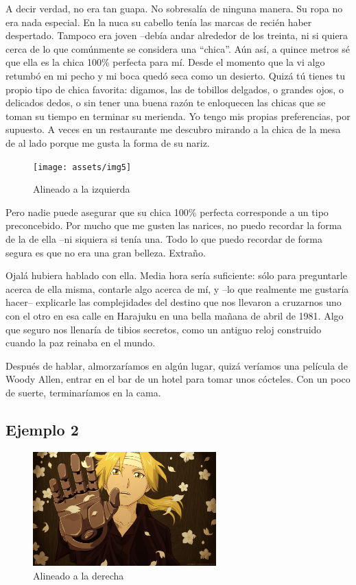 \documentclass[letterpaper]{article}
\begin{document}
  A decir verdad, no era tan guapa. No sobresalía de ninguna manera. Su ropa no
  era nada especial. En la nuca su cabello tenía las marcas de recién haber
  despertado. Tampoco era joven –debía andar alrededor de los treinta, ni si
  quiera cerca de lo que comúnmente se considera una “chica”. Aún así, a quince
  metros sé que ella es la chica 100\% perfecta para mí. Desde el momento que la
  vi algo retumbó en mi pecho y mi boca quedó seca como un desierto. Quizá tú
  tienes tu propio tipo de chica favorita: digamos, las de tobillos delgados, o
  grandes ojos, o delicados dedos, o sin tener una buena razón te enloquecen las
  chicas que se toman su tiempo en terminar su merienda. Yo tengo mis propias
  preferencias, por supuesto. A veces en un restaurante me descubro mirando a la
  chica de la mesa de al lado porque me gusta la forma de su nariz.
	
	\begin{figure}
		\centering
		\texttt{[image: assets/img5]}
		\caption{Alineado a la izquierda}
	\end{figure}

Pero nadie puede asegurar que su chica 100\% perfecta corresponde a un tipo
preconcebido. Por mucho que me gusten las narices, no puedo recordar la forma de
la de ella –ni siquiera si tenía una. Todo lo que puedo recordar de forma segura
es que no era una gran belleza. Extraño.

Ojalá hubiera hablado con ella. Media hora sería suficiente: sólo para
preguntarle acerca de ella misma, contarle algo acerca de mí, y –lo que
realmente me gustaría hacer– explicarle las complejidades del destino que nos
llevaron a cruzarnos uno con el otro en esa calle en Harajuku en una bella
mañana de abril de 1981. Algo que seguro nos llenaría de tibios secretos, como
un antiguo reloj construido cuando la paz reinaba en el mundo.

Después de hablar, almorzaríamos en algún lugar, quizá veríamos una película de
Woody Allen, entrar en el bar de un hotel para tomar unos cócteles. Con un poco
de suerte, terminaríamos en la cama.

	\subsection{Ejemplo 2}
	\begin{figure}
		\centering
		\includegraphics[width=200pt]{assets/img6}
		\caption{Alineado a la derecha}
	\end{figure}
	
\end{document}
